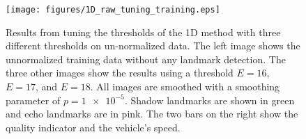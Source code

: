 \begin{figure}   %
  \centering
  \texttt{[image: figures/1D\_raw\_tuning\_training.eps]}
  \caption[Results of tuning threshold of the 1D method]{Results from tuning the thresholds of the 1D method with three different thresholds on un-normalized data. The left image shows the unnormalized training data without any landmark detection. The three other images show the results using a threshold $E = 16$, $E = 17$, and $E = 18$. All images are smoothed with a smoothing parameter of $p = \num{1e-5}$. Shadow landmarks are shown in green and echo landmarks are in pink. The two bars on the right show the quality indicator and the vehicle's speed.}
  \label{fig:1D_raw_tuning_training}
\end{figure}


